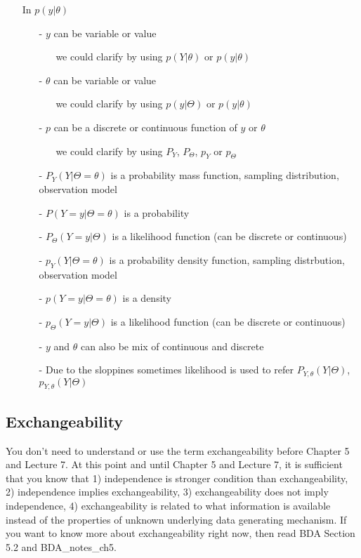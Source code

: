 \documentclass[a4paper,11pt,english]{article}
\begin{document}
  \begin{itemize}
  \item[] In $p(y|\theta)$
  \begin{itemize}
  \item[-] $y$ can be variable or value
    \begin{itemize}
    \item[] we could clarify by using $p(Y|\theta)$ or $p(y|\theta)$
    \end{itemize}
  \item[-] $\theta$ can be variable or value
    \begin{itemize}
    \item[] we could clarify by using $p(y|\Theta)$ or $p(y|\theta)$
    \end{itemize}
  \item[-] $p$ can be a discrete or continuous function of $y$ or $\theta$
    \begin{itemize}
    \item[] we could clarify by using $P_Y$, $P_\Theta$, $p_Y$ or $p_\Theta$
    \end{itemize}
\item[-]
  $P_Y(Y|\Theta=\theta)$ is a probability mass function, sampling distribution, observation model
\item[-]
$P(Y=y|\Theta=\theta)$ is a probability
\item[-]
$P_\Theta(Y=y|\Theta)$ is a likelihood function (can be discrete or continuous)
\item[-] $p_Y(Y|\Theta=\theta)$ is a probability density function, sampling distrbution, observation model
\item[-] $p(Y=y|\Theta=\theta)$ is a density
\item[-] $p_\Theta(Y=y|\Theta)$ is a likelihood function (can be discrete or continuous)
  \item[-] $y$ and $\theta$ can also be mix of continuous and discrete
    \item[-] Due to the sloppines sometimes likelihood is used to refer
$P_{Y,\theta}(Y|\Theta)$, $p_{Y,\theta}(Y|\Theta)$

  \end{itemize}
\end{itemize}

\subsection*{Exchangeability}

You don't need to understand or use the term exchangeability before
Chapter 5 and Lecture 7. At this point and until Chapter 5 and Lecture
7, it is sufficient that you know that 1) independence is stronger
condition than exchangeability, 2) independence implies
exchangeability, 3) exchangeability does not imply independence, 4)
exchangeability is related to what information is available instead of
the properties of unknown underlying data generating mechanism.  If
you want to know more about exchangeability right now, then read BDA
Section 5.2 and BDA\_notes\_ch5.
\end{document}
